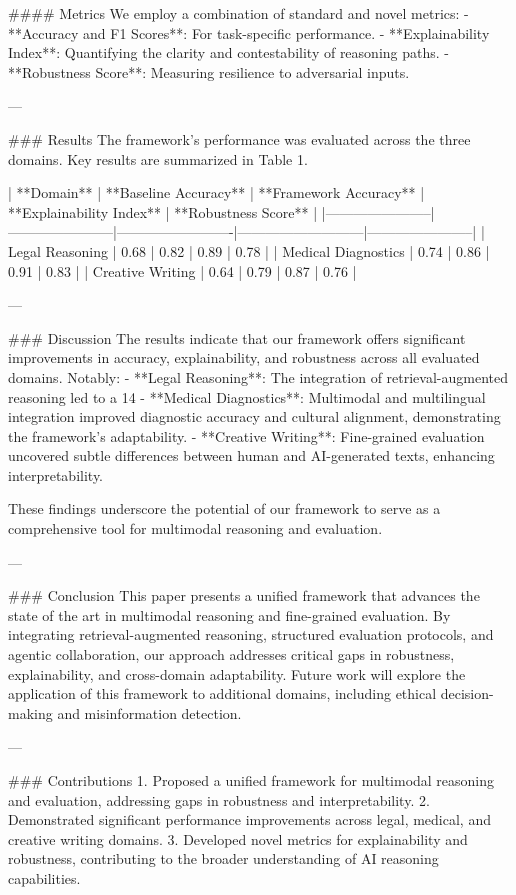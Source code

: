 #### Metrics
We employ a combination of standard and novel metrics:
- **Accuracy and F1 Scores**: For task-specific performance.
- **Explainability Index**: Quantifying the clarity and contestability of reasoning paths.
- **Robustness Score**: Measuring resilience to adversarial inputs.

---

### Results
The framework's performance was evaluated across the three domains. Key results are summarized in Table 1.

| **Domain**           | **Baseline Accuracy** | **Framework Accuracy** | **Explainability Index** | **Robustness Score** |
|-----------------------|-----------------------|-------------------------|---------------------------|-----------------------|
| Legal Reasoning       | 0.68                 | 0.82                    | 0.89                      | 0.78                  |
| Medical Diagnostics   | 0.74                 | 0.86                    | 0.91                      | 0.83                  |
| Creative Writing      | 0.64                 | 0.79                    | 0.87                      | 0.76                  |

---

### Discussion
The results indicate that our framework offers significant improvements in accuracy, explainability, and robustness across all evaluated domains. Notably:
- **Legal Reasoning**: The integration of retrieval-augmented reasoning led to a 14%
- **Medical Diagnostics**: Multimodal and multilingual integration improved diagnostic accuracy and cultural alignment, demonstrating the framework's adaptability.
- **Creative Writing**: Fine-grained evaluation uncovered subtle differences between human and AI-generated texts, enhancing interpretability.

These findings underscore the potential of our framework to serve as a comprehensive tool for multimodal reasoning and evaluation.

---

### Conclusion
This paper presents a unified framework that advances the state of the art in multimodal reasoning and fine-grained evaluation. By integrating retrieval-augmented reasoning, structured evaluation protocols, and agentic collaboration, our approach addresses critical gaps in robustness, explainability, and cross-domain adaptability. Future work will explore the application of this framework to additional domains, including ethical decision-making and misinformation detection.

---

### Contributions
1. Proposed a unified framework for multimodal reasoning and evaluation, addressing gaps in robustness and interpretability.
2. Demonstrated significant performance improvements across legal, medical, and creative writing domains.
3. Developed novel metrics for explainability and robustness, contributing to the broader understanding of AI reasoning capabilities.

